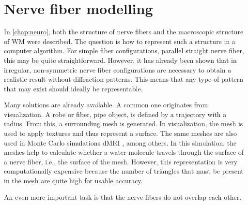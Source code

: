 \setcounter{chapter}{3}
\chapter{Nerve fiber modelling}
\label{chap:sof:modelling}
% 
\par
In \cref{chap:neuro}, both the structure of nerve fibers and the macroscopic structure of \ac{WM} were described.
The question is how to represent such a structure in a computer algorithm.
For simple fiber configurations, \eg{} parallel straight nerve fiber, this may be quite straightforward.
However, it has already been shown that in \dummy{} \cite{MenzelDissertation} irregular, non-symmetric nerve fiber configurations are necessary to obtain a realistic result without diffraction patterns.
This means that any type of pattern that may exist should ideally be representable.
\par
% 
Many solutions are already available.
A common one originates from visualization.
A robe or fiber, \ie{} pipe object, is defined by a trajectory with a radius.
From this, a surrounding mesh is generated.
In visualization, the mesh is used to apply textures and thus represent a surface. 
The same meshes are also used in Monte Carlo simulations \ac{dMRI} \cite{Ginsburger2019,ginsburgerDis2019}, among others.
In this simulation, the meshes help to calculate whether a water molecule travels through the surface of a nerve fiber, i.e., the surface of the mesh.
However, this representation is very computationally expensive because the number of triangles that must be present in the mesh are quite high for usable accuracy.
\par
% 
An even more important task is that the nerve fibers do not overlap each other.

